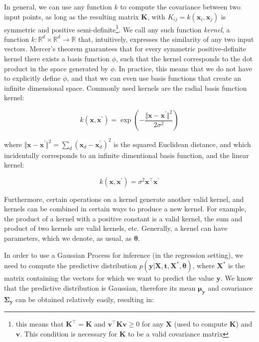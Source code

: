 \documentclass[a4paper]{book}
\begin{document}
In general, we can use any function $k$ to compute the covariance between two input points, as long as the resulting matrix $\bm K$, with $K_{ij}=k(\bm x_i,\bm x_j)$ is symmetric and positive semi-definite\footnote{this means that $\bm K^\intercal=\bm K$ and $\bm v^\intercal\bm K\bm v\geq 0$ for any $\bm X$ (used to compute $\bm K$) and $\bm v$. This condition is necessary for $\bm K$ to be a valid covariance matrix}. We call any such function  \emph{kernel}, a function $k:\mathbb{R}^d\times\mathbb{R}^d\rightarrow\mathbb{R}$ that, intuitively, expresses the similarity of any two input vectors. Mercer's theorem guarantees that for every symmetric positive-definite kernel there exists a basis function $\phi$, such that the kernel corresponds to the dot product in the space generated by $\phi$. In practice, this means that we do not have to explicitly define $\phi$, and that we can even use basis functions that create an infinite dimensional space. Commonly used kernels are the radial basis function kernel:

\begin{equation}
k(\bm x, \bm x^\prime)=\exp\left(-\frac{\Vert\bm x-\bm x^\prime\Vert^2}{2\sigma^2}\right)
\end{equation}

where $\Vert\bm x-\bm x^\prime\Vert^2=\sum_d(\bm x_d-\bm x_d^\prime)^2$ is the squared Euclidean distance, and which incidentally corresponds to an infinite dimentional basis function, and the linear kernel:

\begin{equation}
k(\bm x, \bm x^\prime)=\sigma^2\bm x^\intercal\bm x^\prime
\end{equation}

Furthermore, certain operations on a kernel generate another valid kernel, and kernels can be combined in certain ways to produce a new kernel. For example, the product of a kernel with a positive constant is a valid kernel, the sum and product of two kernels are valid kernels, etc. Generally, a kernel can have parameters, which we denote, as usual, as $\bm\theta$.

In order to use a Gaussian Process for inference (in the regression setting), we need to compute the predictive distribution $p(\bm y\vert\bm X, \bm t, \bm X^*,\bm\theta) $, where $\bm X^*$ is the matrix containing the vectors for which we want to predict the value $\bm y$. We know that the predictive distribution is Gaussian, therefore its mean $\bm\mu_{\bm y}$ and covariance $\bm\Sigma_{\bm y}$ can be obtained relatively easily, resulting in:
\end{document}
